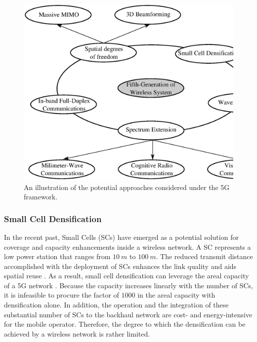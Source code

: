\begin{figure}
\centering
\includegraphics[width = 0.98 \columnwidth]{figures/5G}
\caption{An illustration of the potential approaches considered under the 5G framework.}
\label{fig_Int:5G}
\end{figure}


\subsubsection*{Small Cell Densification }

In the recent past, Small Cells (SCs) have emerged as a potential solution for coverage and capacity enhancements inside a wireless network. A SC represents a low power station that ranges from $\SI{10}{m}$ to $\SI{100}{m}$. The reduced transmit distance accomplished with the deployment of SCs enhances the link quality and aids spatial reuse \cite{Chander08}.
As a result, small cell densification can leverage the areal capacity of a 5G network \cite{Andrews14}. Because the capacity increases linearly with the number of SCs, it is infeasible to procure the factor of $1000$ in the areal capacity with densification alone. In addition, the operation and the integration of these substantial number of SCs to the backhaul network are cost- and energy-intensive for the mobile operator. Therefore, the degree to which the densification can be achieved by a wireless network is rather limited.





